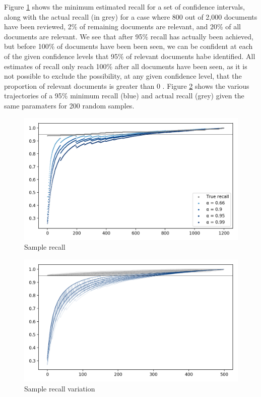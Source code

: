 \documentclass{bmcart}
\begin{document}
	Figure \ref{sample-recall} shows the minimum estimated recall for a set of confidence intervals, along with the actual recall (in grey) for a case where 800 out of 2,000 documents have been reviewed, 2\% of remaining documents are relevant, and 20\% of all documents are relevant. We see that after 95\% recall has actually been achieved, but before 100\% of documents have been been seen, we can be confident at each of the given confidence levels that 95\% of relevant documents habe identified. All estimates of recall only reach 100\% after all documents have been seen, as it is not possible to exclude the possibility, at any given confidence level, that the proportion of relevant documents is greater than 0 . Figure \ref{sample-recall-variation} shows the various trajectories of a 95\% minimum recall (blue) and actual recall (grey) given the same paramaters for 200 random samples.

	\begin{figure}
		\includegraphics[width=\linewidth]{../images/sample_recall}
		\caption{Sample recall}
		\label{sample-recall}
	\end{figure}	

	\begin{figure}
		\includegraphics[width=\linewidth]{../images/sample_recall_2}
		\caption{Sample recall variation}
		\label{sample-recall-variation}
	\end{figure}	
\end{document}
